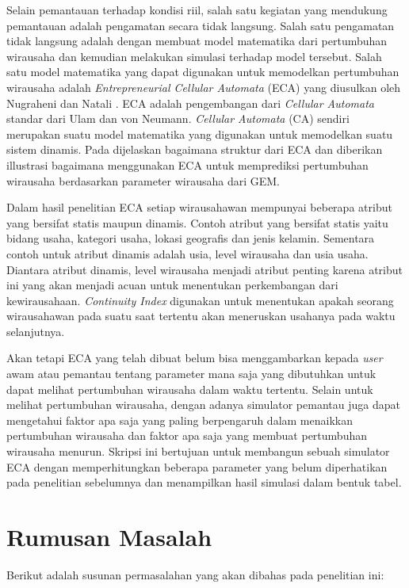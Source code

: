 Selain pemantauan terhadap kondisi riil, salah satu kegiatan yang mendukung pemantauan adalah pengamatan secara tidak langsung. Salah satu pengamatan tidak langsung adalah dengan membuat model matematika dari pertumbuhan wirausaha dan kemudian melakukan simulasi terhadap model tersebut. Salah satu model matematika yang dapat digunakan untuk memodelkan pertumbuhan wirausaha adalah \textit{Entrepreneurial Cellular Automata} (ECA) yang diusulkan oleh Nugraheni dan Natali \cite{ECA}. ECA adalah pengembangan dari \textit{Cellular Automata} standar dari Ulam dan von Neumann. \textit{Cellular Automata} (CA) sendiri merupakan suatu model matematika yang digunakan untuk memodelkan suatu sistem dinamis. Pada \cite{ECA} dijelaskan bagaimana struktur dari ECA dan diberikan illustrasi bagaimana menggunakan ECA untuk memprediksi pertumbuhan wirausaha berdasarkan parameter wirausaha dari GEM. 


Dalam hasil penelitian ECA setiap wirausahawan mempunyai beberapa atribut yang bersifat statis maupun dinamis. Contoh atribut yang bersifat statis yaitu bidang usaha, kategori usaha, lokasi geografis dan jenis kelamin. Sementara contoh untuk atribut dinamis adalah usia, level wirausaha dan usia usaha. Diantara atribut dinamis, level wirausaha menjadi atribut penting karena atribut ini yang akan menjadi acuan untuk menentukan perkembangan dari kewirausahaan. \textit{Continuity Index} digunakan untuk menentukan apakah seorang wirausahawan pada suatu saat tertentu akan meneruskan usahanya pada waktu selanjutnya.


Akan tetapi ECA yang telah dibuat belum bisa menggambarkan kepada \textit{user} awam atau pemantau tentang parameter mana saja yang dibutuhkan untuk dapat melihat pertumbuhan wirausaha dalam waktu tertentu. Selain untuk melihat pertumbuhan wirausaha, dengan adanya simulator pemantau juga dapat mengetahui faktor apa saja yang paling berpengaruh dalam menaikkan pertumbuhan wirausaha dan faktor apa saja yang membuat pertumbuhan wirausaha menurun.
Skripsi ini bertujuan untuk membangun sebuah simulator ECA dengan memperhitungkan beberapa parameter yang belum diperhatikan pada penelitian sebelumnya dan menampilkan hasil simulasi dalam bentuk tabel.



\section{Rumusan Masalah}
\label{sec:rumusan}
Berikut adalah susunan permasalahan yang akan dibahas pada penelitian ini:


